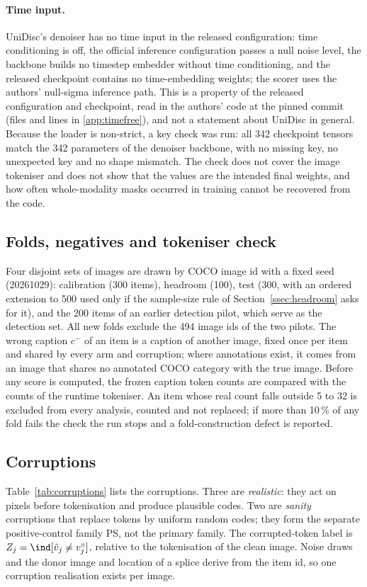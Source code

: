 \paragraph{Time input.}
UniDisc's denoiser has no time input in the released configuration: time conditioning is off, the official inference
configuration passes a null noise level, the backbone builds no timestep embedder without time conditioning, and the released
checkpoint contains no time-embedding weights; the scorer uses the authors' null-sigma inference path.
This is a property of the released configuration and checkpoint, read in the authors' code at the pinned commit (files and lines in
\ref{app:timefree}), and not a statement about UniDisc in general.
Because the loader is non-strict, a key check was run: all 342 checkpoint tensors match the 342 parameters of the denoiser backbone,
with no missing key, no unexpected key and no shape mismatch.
The check does not cover the image tokeniser and does not show that the values are the intended final weights, and how often
whole-modality masks occurred in training cannot be recovered from the code.

\subsection{Folds, negatives and tokeniser check}\label{ssec:folds}
Four disjoint sets of images are drawn by COCO image id with a fixed seed (20261029): calibration (300 items), headroom
(100), test (300, with an ordered extension to 500 used only if the sample-size rule of Section~\ref{ssec:headroom} asks
for it), and the 200 items of an earlier detection pilot, which serve as the detection set.
All new folds exclude the 494 image ids of the two pilots.
The wrong caption $c^-$ of an item is a caption of another image, fixed once per item and shared by every arm and
corruption; where annotations exist, it comes from an image that shares no annotated COCO category with the true image.
Before any score is computed, the frozen caption token counts are compared with the counts of the runtime tokeniser.
An item whose real count falls outside 5 to 32 is excluded from every analysis, counted and not replaced; if more than
10\,\% of any fold fails the check the run stops and a fold-construction defect is reported.

\subsection{Corruptions}\label{ssec:corruptions}
Table~\ref{tab:corruptions} lists the corruptions.
Three are \emph{realistic}: they act on pixels before tokenisation and produce plausible codes.
Two are \emph{sanity} corruptions that replace tokens by uniform random codes; they form the separate positive-control family PS,
not the primary family.
The corrupted-token label is $Z_j=\ind[\tilde v_j\neq v^\circ_j]$, relative to the tokenisation of the clean image.
Noise draws and the donor image and location of a splice derive from the item id, so one corruption realisation exists per image.

